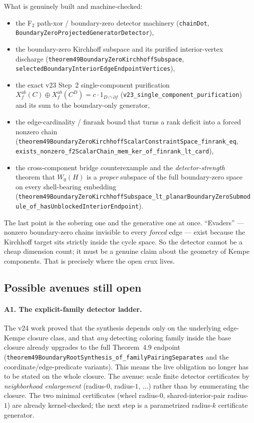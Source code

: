 What is genuinely built and machine-checked:
\begin{itemize}\itemsep1pt
  \item the F$_2$ path-xor / boundary-zero detector machinery
    (\verb|chainDot|, \verb|BoundaryZeroProjectedGeneratorDetector|),
  \item the boundary-zero Kirchhoff subspace and its purified interior-vertex
    discharge (\verb|theorem49BoundaryZeroKirchhoffSubspace|,
    \verb|selectedBoundaryInteriorEdgeEndpointVertices|),
  \item the exact v23 Step~2 single-component purification
    \(X_f^{ab}(C)\oplus X_f^{ab}(C^D)=c\cdot 1_{D\cap\partial f}\)
    (\verb|v23_single_component_purification|) and its sum to the
    boundary-only generator,
  \item the edge-cardinality / finrank bound that turns a rank deficit into a
    forced nonzero chain
    (\verb|theorem49BoundaryZeroKirchhoffScalarConstraintSpace_finrank_eq|,
    \verb|exists_nonzero_f2ScalarChain_mem_ker_of_finrank_lt_card|),
  \item the cross-component bridge counterexample and the
    \emph{detector-strength} theorem that $W_0(H)$ is a \emph{proper} subspace
    of the full boundary-zero space on every shell-bearing embedding
    (\verb|theorem49BoundaryZeroKirchhoffSubspace_lt_planarBoundaryZeroSubmodule_of_hasUnblockedInteriorEndpoint|).
\end{itemize}

The last point is the sobering one and the generative one at once. ``Evaders''
--- nonzero boundary-zero chains invisible to every \emph{forced} edge --- exist
because the Kirchhoff target sits strictly inside the cycle space. So the
detector cannot be a cheap dimension count; it must be a genuine claim about the
geometry of Kempe components. That is precisely where the open crux lives.

\subsection{Possible avenues still open}

\paragraph{A1. The explicit-family detector ladder.} The v24 work proved that
the synthesis depends only on the underlying edge-Kempe closure class, and that
\emph{any} detecting coloring family inside the base closure already upgrades to
the full Theorem~4.9 endpoint
(\verb|theorem49BoundaryRootSynthesis_of_familyPairingSeparates| and the
coordinate/edge-predicate variants). This means the live obligation no longer
has to be stated on the whole closure. The avenue: scale finite detector
certificates by \emph{neighborhood enlargement} (radius-$0$, radius-$1$, $\dots$)
rather than by enumerating the closure. The two minimal certificates
(wheel radius-$0$, shared-interior-pair radius-$1$) are already kernel-checked;
the next step is a parametrized radius-$k$ certificate generator.

